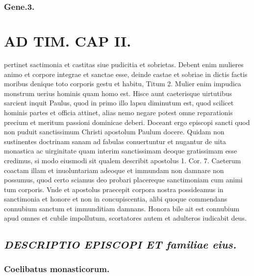 \documentclass{article}
\begin{document}
\begin{pages}
\subsubsection*{Gene.3. }
\section*{AD TIM. CAP II. }
\marginpar{[ p.122 ]}\pstart pertinet sactimonia et castitas siue pudicitia et sobrietas. Debent enim mulieres animo et corpore integrae et sanctae esse, deinde castae et sobriae in dictis factis moribus denique toto corporis gestu et habitu, Titum 2. Mulier enim impudica monstrum uerius hominis quam homo est. Hisce aunt caeterisque uirtutibus sarcient inquit Paulus, quod in primo illo lapsu diminutum est, quod scilicet hominis partes et officia attinet, alias nemo negare potest omne reparationis precium et meritum passioni dominicae deberi. Doceant ergo episcopi sancti quod non puduit sanctissimum Christi apostolum Paulum docere. Quidam non sustinentes doctrinam sanam ad fabulas conuertuntur et nugantur de uita monastica ac uirginitate quam interim sanctissimam deoque gratissimam esse credimus, si modo eiusmodi sit qualem describit apostolus 1. Cor. 7. Caeterum coactam illam et inuoluntariam adeoque et immundam non damnare non possumus, quod certo sciamus deo probari placereque sanctimoniam cum animi tum corporis. Vnde et apostolus praecepit corpora nostra possideamus in sanctimonia et honore et non in concupiscentia, alibi quoque commendans connubium sanctum et immunditiam damnans. Honora bile ait est connubium apud omnes et cubile impollutum, scortatores autem et adulteros iudicabit deus.  \pend 
{}
{}
\subsection*{\textit{DESCRIPTIO EPISCOPI ET familiae eius. }}
\subsubsection*{Coelibatus monasticorum. }

\end{pages}
\end{document}
